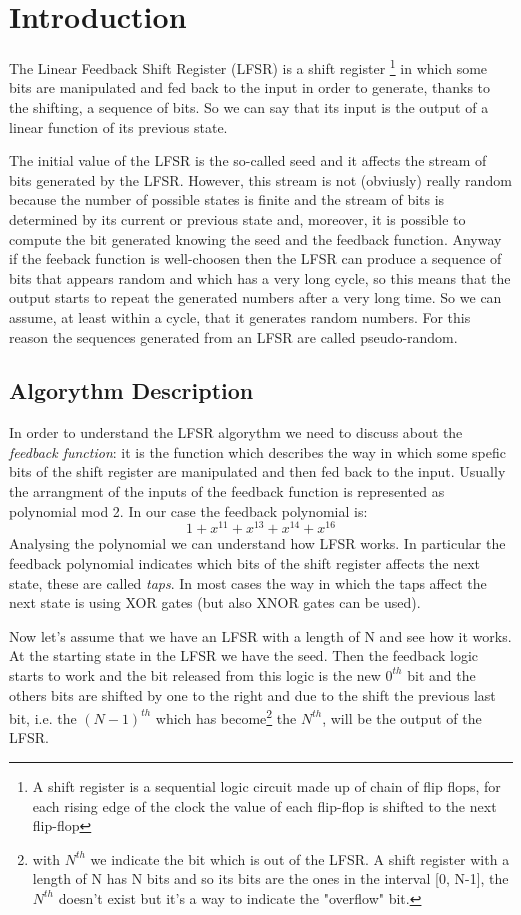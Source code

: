 \documentclass[a4paper]{report}
\begin{document}
\chapter{Introduction}
The Linear Feedback Shift Register (LFSR) is a shift register \footnote{A shift register is a sequential logic circuit made up of  chain of flip flops, for each rising edge of the clock the value of each flip-flop is shifted to the next flip-flop} in which some bits are manipulated and fed back to the input in order to generate, thanks to the shifting, a sequence of bits. So we can say that its input is the output of a linear function of its previous state.

\noindent The initial value of the LFSR is the so-called seed and it affects the stream of bits generated by the LFSR. However, this stream is not (obviusly) really random because the number of possible states is finite and the stream of bits is determined by its current or previous state and, moreover, it is possible to compute the bit generated knowing the seed and the feedback function.
\noindent Anyway if the feeback function is well-choosen then the LFSR can produce a sequence of bits that appears random and which has a very long cycle, so this means that the output starts to repeat the generated numbers after a very long time. So we can assume, at least within a cycle, that it generates random numbers. For this reason the sequences generated from an LFSR are called pseudo-random.

\section{Algorythm Description}
In order to understand the LFSR algorythm we need to discuss about the \emph{feedback function}: it is the function which describes the way in which some spefic bits of the shift register are manipulated and then fed back to the input. Usually the arrangment of the inputs of the feedback function is represented as polynomial mod 2. In our case the feedback polynomial is:
\[1+x^{11}+x^{13}+x^{14}+x^{16}\]
Analysing the polynomial we can understand how LFSR works. In particular the feedback polynomial indicates which bits of the shift register affects the next state, these are called \emph{taps}.
In most cases the way in which the taps affect the next state is using XOR gates (but also XNOR gates can be used).

\noindent Now let's assume that we have an LFSR with a length of N and see how it works. At the starting state in the LFSR we have the seed. Then the feedback logic starts to work and the bit released from this logic is the new $0^{th}$ bit and the others bits are shifted by one to the right and due to the shift the previous last bit, i.e. the $(N-1)^{th}$ which has become\footnote{with $N^{th}$ we indicate the bit which is out of the LFSR. A shift register with a length of N has N bits and so its bits are the ones in the interval [0, N-1], the  $N^{th}$ doesn't exist but it's a way to indicate the "overflow" bit.} the $N^{th}$, will be the output of the LFSR.
\end{document}
